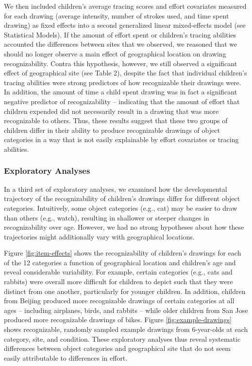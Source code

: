 \documentclass[
  english,
  man]{apa6}
\begin{document}
We then included children's average tracing scores and effort covariates measured for each drawing (average intensity, number of strokes used, and time spent drawing) as fixed effects into a second generalized linear mixed-effects model (see Statistical Models). If the amount of effort spent or children's tracing abilities accounted the differences between sites that we observed, we reasoned that we should no longer observe a main effect of geographical location on drawing recognizability. Contra this hypothesis, however, we still observed a significant effect of geographical site (see Table 2), despite the fact that individual children's tracing abilities were strong predictors of how recognizable their drawings were. In addition, the amount of time a child spent drawing was in fact a significant negative predictor of recognizability -- indicating that the amount of effort that children expended did not necessarily result in a drawing that was more recognizable to others. Thus, these results suggest that these two groups of children differ in their ability to produce recognizable drawings of object categories in a way that is not easily explainable by effort covariates or tracing abilities.

\hypertarget{exploratory-analyses}{%
\subsubsection{Exploratory Analyses}\label{exploratory-analyses}}

In a third set of exploratory analyses, we examined how the developmental trajectory of the recognizability of children's drawings differ for different object categories. Intuitively, some object categories (e.g., cat) may be easier to draw than others (e.g., watch), resulting in shallower or steeper changes in recognizability over age. However, we had no strong hypotheses about how these trajectories might additionally vary with geographical locations.

Figure \ref{fig:item-effects} shows the recognizability of children's drawings for each of the 12 categories a function of geographical location and children's age and reveal considerable variability. For example, certain categories (e.g., cats and rabbits) were overall more difficult for children to depict such that they were distinct from one another, particularly for younger children. In addition, children from Beijing produced more recognizable drawings of certain categories at all ages -- including airplanes, birds, and rabbits -- while older children from San Jose produced more recognizable drawings of bikes. Figure \ref{fig:example-drawings} shows recognizable, randomly sampled example drawings from 6-year-olds at each category, site, and condition. These exploratory analyses thus reveal systematic differences between object categories and geographical site that do not seem easily attributable to differences in effort.
\end{document}
